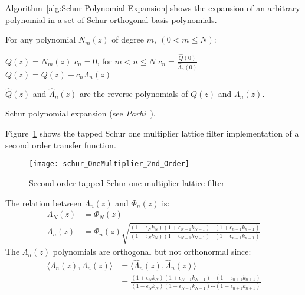 \documentclass[a4paper,twoside,10pt,english]{article}
\begin{document}
Algorithm~\ref{alg:Schur-Polynomial-Expansion} shows the expansion of an
arbitrary polynomial in a set of Schur orthogonal basis polynomials.
 
\begin{algorithm}[!ht]
For any polynomial $N_{m}\left(z\right)$ of degree $m,\:(0<m\leq N)$:
\begin{algorithmic}
\State $Q\left(z\right)=N_{m}\left(z\right)$ 
\State $c_{n}=0$, for $m<n\leq N$
  \State $c_{n}=\frac{\hat{Q}(0)}{\hat{\Lambda}_{n}(0)}$
  \State $Q\left(z\right)=Q\left(z\right)-c_{n}\Lambda_{n}\left(z\right)$
\EndFor
\end{algorithmic}
$\hat{Q}\left(z\right)$ and $\hat{\Lambda}_{n}\left(z\right)$ are
the reverse polynomials of $Q\left(z\right)$ and $\Lambda_{n}\left(z\right)$.
\caption{Schur polynomial expansion (see 
\emph{Parhi}~\cite[Section 12.2.3]{Parhi_VLSIDigitalSignalProcessingSystems}).}
\label{alg:Schur-Polynomial-Expansion}
\end{algorithm}

Figure~\ref{fig:Second-order-tapped-Schur-one-multiplier-lattice-filter}
shows the tapped Schur one multiplier lattice filter implementation of a
second order transfer function.

\begin{figure}[!ht]
\centering
\texttt{[image: schur\_OneMultiplier\_2nd\_Order]}
\caption{Second-order tapped Schur one-multiplier lattice filter}
\label{fig:Second-order-tapped-Schur-one-multiplier-lattice-filter}
\end{figure}

The relation between $\Lambda_{n}\left(z\right)$ and $\Phi_{n}\left(z\right)$ is:
\begin{align*}
\Lambda_{N}\left(z\right) & = \Phi_{N}\left(z\right)\\
  \Lambda_{n}\left(z\right)
  &= \Phi_{n}\left(z\right)\sqrt{\frac{\left(1+\epsilon_{N}k_{N}\right)
    \left(1+\epsilon_{N-1}k_{N-1}\right)\cdots
    \left(1+\epsilon_{n+1}k_{n+1}\right)}
    {\left(1-\epsilon_{N}k_{N}\right)
    \left(1-\epsilon_{N-1}k_{N-1}\right)\cdots
    \left(1-\epsilon_{n+1}k_{n+1}\right)}}
\end{align*}
The $\Lambda_{n}\left(z\right)$ polynomials are orthogonal but not orthonormal
since:
\begin{align*}
\langle \Lambda_{n}\left(z\right),\Lambda_{n}\left(z\right)\rangle
&= \langle\hat{\Lambda}_{n}\left(z\right),\hat{\Lambda}_{n}\left(z\right)\rangle\\
&=\frac{\left(1+\epsilon_{N}k_{N}\right)\left(1+\epsilon_{N-1}k_{N-1}\right)
  \cdots\left(1+\epsilon_{n+1}k_{n+1}\right)}
  {\left(1-\epsilon_{N}k_{N}\right)\left(1-\epsilon_{N-1}k_{N-1}\right)
  \cdots\left(1-\epsilon_{n+1}k_{n+1}\right)}
\end{align*}
\end{document}
